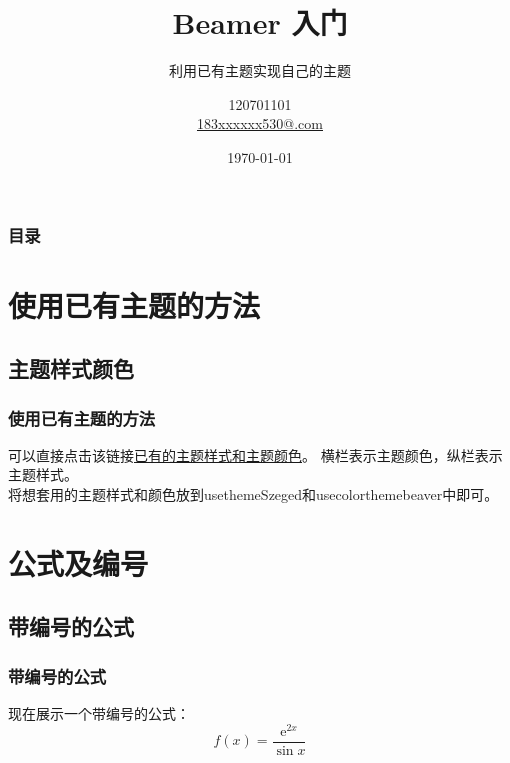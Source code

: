 \documentclass[aspectratio=169, 10pt, utf8, mathserif]{beamer}
\begin{document}
	
	
	\title{Beamer 入门}
	\subtitle{利用已有主题实现自己的主题}
	\author[120701101]{120701101 \\ \small \href{mailto:183xxxxx30@163.com}{183xxxxxx530@.com}}
	\date{\today}
	\begin{frame}
		\titlepage
	\end{frame}
	
	\begin{frame}
		\frametitle{目录}
		\tableofcontents[hideallsubsections]
	\end{frame}
	
	\section{使用已有主题的方法}
	\subsection{主题样式颜色}
	\begin{frame}
		\frametitle{使用已有主题的方法}
		可以直接点击该链接\underline{\href{https://mpetroff.net/files/beamer-theme-matrix/}{已有的主题样式和主题颜色}}。
		横栏表示主题颜色，纵栏表示主题样式。\\
		将想套用的主题样式和颜色放到usetheme{Szeged}和usecolortheme{beaver}中即可。
	\end{frame}
	
	\section{公式及编号}
	\subsection{带编号的公式}
	\begin{frame}
		\frametitle{带编号的公式}
		现在展示一个带编号的公式：
		\begin{equation}
			f(x) = \frac{\mathrm e^{2x}}{\sin x}
		\end{equation}
	\end{frame}
	
\end{document}

